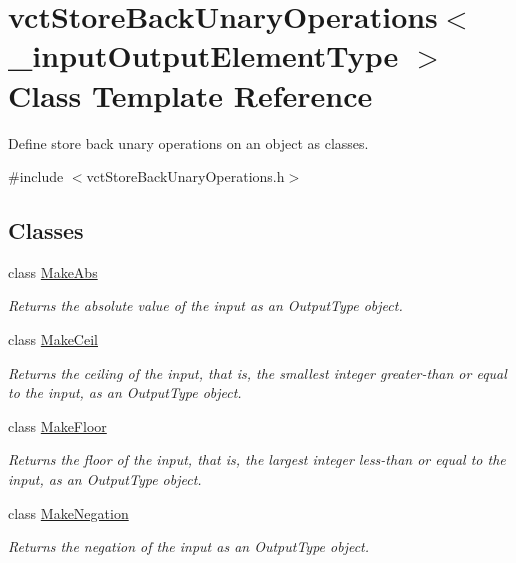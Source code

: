 \hypertarget{classvct_store_back_unary_operations}{\section{vct\-Store\-Back\-Unary\-Operations$<$ \-\_\-input\-Output\-Element\-Type $>$ Class Template Reference}
\label{classvct_store_back_unary_operations}
}


Define store back unary operations on an object as classes.  




{\ttfamily \#include $<$vct\-Store\-Back\-Unary\-Operations.\-h$>$}

\subsection*{Classes}
\begin{DoxyCompactItemize}
\item 
class \hyperlink{classvct_store_back_unary_operations_1_1_make_abs}{Make\-Abs}
\begin{DoxyCompactList}\small\item\em Returns the absolute value of the input as an Output\-Type object. \end{DoxyCompactList}\item 
class \hyperlink{classvct_store_back_unary_operations_1_1_make_ceil}{Make\-Ceil}
\begin{DoxyCompactList}\small\item\em Returns the ceiling of the input, that is, the smallest integer greater-\/than or equal to the input, as an Output\-Type object. \end{DoxyCompactList}\item 
class \hyperlink{classvct_store_back_unary_operations_1_1_make_floor}{Make\-Floor}
\begin{DoxyCompactList}\small\item\em Returns the floor of the input, that is, the largest integer less-\/than or equal to the input, as an Output\-Type object. \end{DoxyCompactList}\item 
class \hyperlink{classvct_store_back_unary_operations_1_1_make_negation}{Make\-Negation}
\begin{DoxyCompactList}\small\item\em Returns the negation of the input as an Output\-Type object. \end{DoxyCompactList}\end{DoxyCompactItemize}

